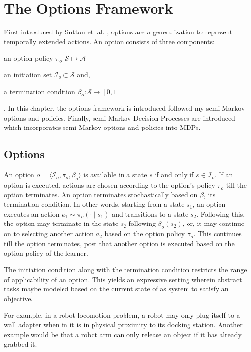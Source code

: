 \normallinespacing

\chapter{The Options Framework}

First introduced by Sutton et. al. \cite{sutton_between_1999}, options are a generalization to represent temporally extended actions.
An option consists of three components:
\begin{inparaenum}[(a)]
    \item an option policy $\pi_o : \mathcal{S} \mapsto \mathcal{A}$
    \item an initiation set $\mathcal{I}_o \subset \mathcal{S}$ and,
    \item a termination condition $\beta_o : \mathcal{S} \mapsto [0, 1]$
\end{inparaenum}.
In this chapter, the options framework is introduced followed my semi-Markov options and policies. Finally, semi-Markov Decision Processes are introduced which incorporates semi-Markov options and policies into MDPs.

\section{Options}

An option $o = \langle \mathcal{I}_o, \pi_o, \beta_o \rangle$ is available in a state $s$ if and only if $s \in \mathcal{I}_o$.
If an option is executed, actions are chosen according to the option's policy $\pi_o$ till the option terminates.
An option terminates stochastically based on $\beta$, its termination condition.
In other words, starting from a state $s_1$, an option executes an action $a_1 \sim \pi_o(\cdot \mid s_1)$ and transitions to a state $s_2$.
Following this, the option may terminate in the state $s_2$ following $\beta_o(s_2)$, or, it may continue on to selecting another action $a_2$ based on the option policy $\pi_o$.
This continues till the option terminates, post that another option is executed based on the option policy of the learner.

The initiation condition along with the termination condition restricts the range of applicability of an option.
This yields an expressive setting wherein abstract tasks maybe modeled based on the current state of as system to satisfy an objective.

For example, in a robot locomotion problem, a robot may only plug itself to a wall adapter when in it is in physical proximity to its docking station.
Another example would be that a robot arm can only release an object if it has already grabbed it.


